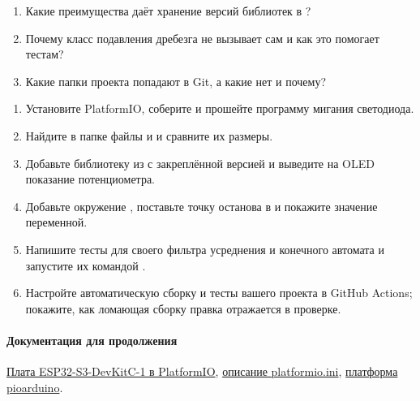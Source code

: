 \begin{selfcheck}
\begin{enumerate}
  \item Какие преимущества даёт хранение версий библиотек в ?
  \item Почему класс подавления дребезга не вызывает  сам и как это помогает тестам?
  \item Какие папки проекта попадают в Git, а какие нет и почему?
\end{enumerate}
\end{selfcheck}

\begin{tasks}
\begin{enumerate}
\item {} Установите PlatformIO, соберите и прошейте программу мигания светодиода.
\item {} Найдите в папке  файлы  и  и сравните их размеры.
\item {} Добавьте библиотеку из  с закреплённой версией и выведите на OLED показание потенциометра.
\item {} Добавьте окружение , поставьте точку останова в  и покажите значение переменной.
\item {} Напишите тесты для своего фильтра усреднения и конечного автомата и запустите их командой .
\item {} Настройте автоматическую сборку и тесты вашего проекта в GitHub Actions; покажите, как ломающая сборку правка отражается в проверке.
\end{enumerate}
\end{tasks}

\paragraph{Документация для продолжения}\href{https://docs.platformio.org/en/latest/boards/espressif32/esp32-s3-devkitc-1.html}{Плата ESP32-S3-DevKitC-1 в PlatformIO},
\href{https://docs.platformio.org/en/latest/projectconf/index.html}{описание platformio.ini},
\href{https://github.com/pioarduino/platform-espressif32}{платформа pioarduino}.
